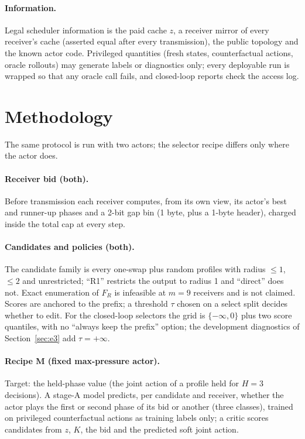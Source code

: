 \documentclass[11pt]{article}
\theoremstyle{definition}
\begin{document}
\paragraph{Information.} Legal scheduler information is the paid cache $z$, a receiver mirror of
every receiver's cache (asserted equal after every transmission), the public topology and the
known actor code. Privileged quantities (fresh states, counterfactual actions, oracle rollouts)
may generate labels or diagnostics only; every deployable run is wrapped so that any oracle call
fails, and closed-loop reports check the access log.

\section{Methodology}
The same protocol is run with two actors; the selector recipe differs only where the actor does.
\paragraph{Receiver bid (both).} Before transmission each receiver computes, from its own view, its
actor's best and runner-up phases and a 2-bit gap bin (1 byte, plus a 1-byte header), charged inside
the total cap at every step.
\paragraph{Candidates and policies (both).} The candidate family is every one-swap plus random
profiles with radius $\le 1$, $\le 2$ and unrestricted; ``R1'' restricts the output to radius 1 and
``direct'' does not. Exact enumeration of $F_R$ is infeasible at $m=9$ receivers and is not claimed.
Scores are anchored to the prefix; a threshold $\tau$ chosen on a select split decides whether to
edit. For the closed-loop selectors the grid is $\{-\infty, 0\}$ plus two score quantiles, with no
``always keep the prefix'' option; the development diagnostics of Section~\ref{sec:e3} add
$\tau=+\infty$.
\paragraph{Recipe M (fixed max-pressure actor).} Target: the held-phase value (the joint action of a
profile held for $H=3$ decisions). A stage-A model predicts, per candidate and receiver, whether the
actor plays the first or second phase of its bid or another (three classes), trained on privileged
counterfactual actions as training labels only; a critic scores candidates from $z$, $K$, the bid and
the predicted soft joint action.
\end{document}
